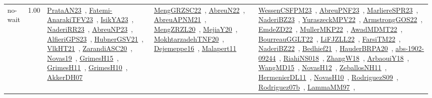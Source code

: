 {\begin{longtable}{p{3cm}r>{\raggedright\arraybackslash}p{6cm}>{\raggedright\arraybackslash}p{6cm}>{\raggedright\arraybackslash}p{8cm}}
\index{no-wait}\index{Concepts!no-wait}no-wait &  1.00 & \href{../works/PrataAN23.pdf}{PrataAN23}~\cite{PrataAN23}, \href{../works/Fatemi-AnarakiTFV23.pdf}{Fatemi-AnarakiTFV23}~\cite{Fatemi-AnarakiTFV23}, \href{../works/IsikYA23.pdf}{IsikYA23}~\cite{IsikYA23}, \href{../works/NaderiRR23.pdf}{NaderiRR23}~\cite{NaderiRR23}, \href{../works/AbreuNP23.pdf}{AbreuNP23}~\cite{AbreuNP23}, \href{../works/AlfieriGPS23.pdf}{AlfieriGPS23}~\cite{AlfieriGPS23}, \href{../works/HubnerGSV21.pdf}{HubnerGSV21}~\cite{HubnerGSV21}, \href{../works/VlkHT21.pdf}{VlkHT21}~\cite{VlkHT21}, \href{../works/ZarandiASC20.pdf}{ZarandiASC20}~\cite{ZarandiASC20}, \href{../works/Novas19.pdf}{Novas19}~\cite{Novas19}, \href{../works/GrimesH15.pdf}{GrimesH15}~\cite{GrimesH15}, \href{../works/GrimesH11.pdf}{GrimesH11}~\cite{GrimesH11}, \href{../works/GrimesH10.pdf}{GrimesH10}~\cite{GrimesH10}, \href{../works/AkkerDH07.pdf}{AkkerDH07}~\cite{AkkerDH07} & \href{../works/MengGRZSC22.pdf}{MengGRZSC22}~\cite{MengGRZSC22}, \href{../works/AbreuN22.pdf}{AbreuN22}~\cite{AbreuN22}, \href{../works/AbreuAPNM21.pdf}{AbreuAPNM21}~\cite{AbreuAPNM21}, \href{../works/MengZRZL20.pdf}{MengZRZL20}~\cite{MengZRZL20}, \href{../works/MejiaY20.pdf}{MejiaY20}~\cite{MejiaY20}, \href{../works/MokhtarzadehTNF20.pdf}{MokhtarzadehTNF20}~\cite{MokhtarzadehTNF20}, \href{../works/Dejemeppe16.pdf}{Dejemeppe16}~\cite{Dejemeppe16}, \href{../works/Malapert11.pdf}{Malapert11}~\cite{Malapert11} & \href{../works/WessenCSFPM23.pdf}{WessenCSFPM23}~\cite{WessenCSFPM23}, \href{../works/AbreuPNF23.pdf}{AbreuPNF23}~\cite{AbreuPNF23}, \href{../works/MarliereSPR23.pdf}{MarliereSPR23}~\cite{MarliereSPR23}, \href{../works/NaderiBZ23.pdf}{NaderiBZ23}~\cite{NaderiBZ23}, \href{../works/YuraszeckMPV22.pdf}{YuraszeckMPV22}~\cite{YuraszeckMPV22}, \href{../works/ArmstrongGOS22.pdf}{ArmstrongGOS22}~\cite{ArmstrongGOS22}, \href{../works/EmdeZD22.pdf}{EmdeZD22}~\cite{EmdeZD22}, \href{../works/MullerMKP22.pdf}{MullerMKP22}~\cite{MullerMKP22}, \href{../works/AwadMDMT22.pdf}{AwadMDMT22}~\cite{AwadMDMT22}, \href{../works/BourreauGGLT22.pdf}{BourreauGGLT22}~\cite{BourreauGGLT22}, \href{../works/LiFJZLL22.pdf}{LiFJZLL22}~\cite{LiFJZLL22}, \href{../works/FarsiTM22.pdf}{FarsiTM22}~\cite{FarsiTM22}, \href{../works/NaderiBZ22.pdf}{NaderiBZ22}~\cite{NaderiBZ22}, \href{../works/Bedhief21.pdf}{Bedhief21}~\cite{Bedhief21}, \href{../works/HauderBRPA20.pdf}{HauderBRPA20}~\cite{HauderBRPA20}, \href{../works/abs-1902-09244.pdf}{abs-1902-09244}~\cite{abs-1902-09244}, \href{../works/RiahiNS018.pdf}{RiahiNS018}~\cite{RiahiNS018}, \href{../works/ZhangW18.pdf}{ZhangW18}~\cite{ZhangW18}, \href{../works/ArbaouiY18.pdf}{ArbaouiY18}~\cite{ArbaouiY18}, \href{../works/WangMD15.pdf}{WangMD15}~\cite{WangMD15}, \href{../works/NovasH12.pdf}{NovasH12}~\cite{NovasH12}, \href{../works/ZeballosNH11.pdf}{ZeballosNH11}~\cite{ZeballosNH11}, \href{../works/HermenierDL11.pdf}{HermenierDL11}~\cite{HermenierDL11}, \href{../works/NovasH10.pdf}{NovasH10}~\cite{NovasH10}, \href{../works/RodriguezS09.pdf}{RodriguezS09}~\cite{RodriguezS09}, \href{../works/Rodriguez07b.pdf}{Rodriguez07b}~\cite{Rodriguez07b}, \href{../works/LammaMM97.pdf}{LammaMM97}~\cite{LammaMM97}, 
\end{longtable}}
